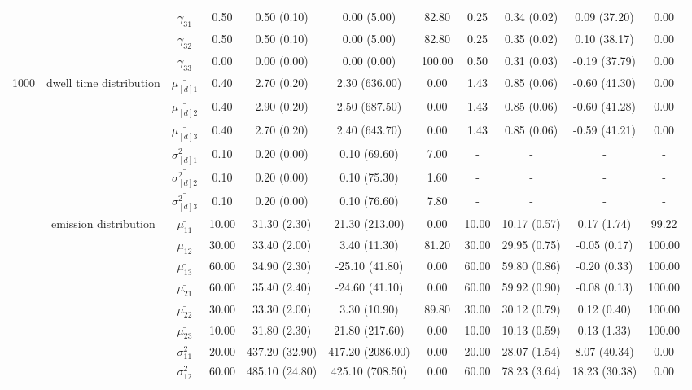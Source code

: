\begin{table}[h]
{\begin{tabular}{ccccccccccc}
 &  & $\gamma_{31}$ & 0.50 & 0.50 (0.10) & 0.00 (5.00) & 82.80 & 0.25 & 0.34 (0.02) & 0.09 (37.20) & 0.00 \\
 &  & $\gamma_{32}$ & 0.50 & 0.50 (0.10) & 0.00 (5.00) & 82.80 & 0.25 & 0.35 (0.02) & 0.10 (38.17) & 0.00 \\
 &  & $\gamma_{33}$ & 0.00 & 0.00 (0.00) & 0.00 (0.00) & 100.00 & 0.50 & 0.31 (0.03) & -0.19 (37.79) & 0.00 \\ \midrule
1000 & dwell time distribution & $\bar{\mu_{[d]1}}$ & 0.40 & 2.70 (0.20) & 2.30 (636.00) & 0.00 & 1.43 & 0.85 (0.06) & -0.60 (41.30) & 0.00 \\
\multirow{26}{*}{} & \multirow{5}{*}{} & $\bar{\mu_{[d]2}}$ & 0.40 & 2.90 (0.20) & 2.50 (687.50) & 0.00 & 1.43 & 0.85 (0.06) & -0.60 (41.28) & 0.00 \\
 &  & $\bar{\mu_{[d]3}}$ & 0.40 & 2.70 (0.20) & 2.40 (643.70) & 0.00 & 1.43 & 0.85 (0.06) & -0.59 (41.21) & 0.00 \\
 &  & $\bar{\sigma^2_{[d]1}}$ & 0.10 & 0.20 (0.00) & 0.10 (69.60) & 7.00 & - & - & - & - \\
 &  & $\bar{\sigma^2_{[d]2}}$ & 0.10 & 0.20 (0.00) & 0.10 (75.30) & 1.60 & - & - & - & - \\
 &  & $\bar{\sigma^2_{[d]3}}$ & 0.10 & 0.20 (0.00) & 0.10 (76.60) & 7.80 & - & - & - & - \\
 & emission distribution & $\bar{\mu_{11}}$ & 10.00 & 31.30 (2.30) & 21.30 (213.00) & 0.00 & 10.00 & 10.17 (0.57) & 0.17 (1.74) & 99.22 \\
 & \multirow{11}{*}{} & $\bar{\mu_{12}}$ & 30.00 & 33.40 (2.00) & 3.40 (11.30) & 81.20 & 30.00 & 29.95 (0.75) & -0.05 (0.17) & 100.00 \\
 &  & $\bar{\mu_{13}}$ & 60.00 & 34.90 (2.30) & -25.10 (41.80) & 0.00 & 60.00 & 59.80 (0.86) & -0.20 (0.33) & 100.00 \\
 &  & $\bar{\mu_{21}}$ & 60.00 & 35.40 (2.40) & -24.60 (41.10) & 0.00 & 60.00 & 59.92 (0.90) & -0.08 (0.13) & 100.00 \\
 &  & $\bar{\mu_{22}}$ & 30.00 & 33.30 (2.00) & 3.30 (10.90) & 89.80 & 30.00 & 30.12 (0.79) & 0.12 (0.40) & 100.00 \\
 &  & $\bar{\mu_{23}}$ & 10.00 & 31.80 (2.30) & 21.80 (217.60) & 0.00 & 10.00 & 10.13 (0.59) & 0.13 (1.33) & 100.00 \\
 &  & $\sigma^2_{11}$ & 20.00 & 437.20 (32.90) & 417.20 (2086.00) & 0.00 & 20.00 & 28.07 (1.54) & 8.07 (40.34) & 0.00 \\
 &  & $\sigma^2_{12}$ & 60.00 & 485.10 (24.80) & 425.10 (708.50) & 0.00 & 60.00 & 78.23 (3.64) & 18.23 (30.38) & 0.00 \\

\end{tabular}}
\end{table}
